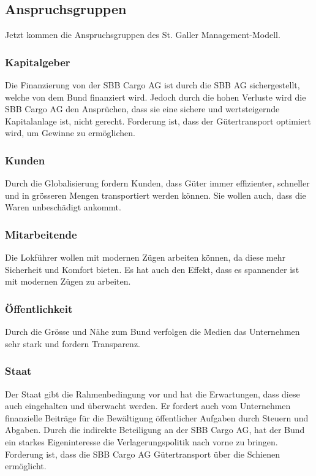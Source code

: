 \documentclass{article}
\begin{document}
\subsection{Anspruchsgruppen}

Jetzt kommen die Anspruchsgruppen des St. Galler Management-Modell.

\subsubsection{Kapitalgeber}
Die Finanzierung von der SBB Cargo AG ist durch die SBB AG sichergestellt, welche von dem Bund finanziert wird.
Jedoch durch die hohen Verluste wird die SBB Cargo AG den Ansprüchen, dass sie eine sichere und wertsteigernde Kapitalanlage ist, nicht gerecht.
Forderung ist, dass der Gütertransport optimiert wird, um Gewinne zu ermöglichen.

\subsubsection{Kunden}
Durch die Globalisierung fordern Kunden, dass Güter immer effizienter, schneller und in grösseren Mengen transportiert werden können.
Sie wollen auch, dass die Waren unbeschädigt ankommt.

\subsubsection{Mitarbeitende}
Die Lokführer wollen mit modernen Zügen arbeiten können, da diese mehr Sicherheit und Komfort bieten.
Es hat auch den Effekt, dass es spannender ist mit modernen Zügen zu arbeiten. 

\subsubsection{Öffentlichkeit}
Durch die Grösse und Nähe zum Bund verfolgen die Medien das Unternehmen sehr stark und fordern Transparenz.

\subsubsection{Staat}
Der Staat gibt die Rahmenbedingung vor und hat die Erwartungen, dass diese auch eingehalten und überwacht werden.
Er fordert auch vom Unternehmen finanzielle Beiträge für die Bewältigung öffentlicher Aufgaben durch Steuern und Abgaben.
Durch die indirekte Beteiligung an der SBB Cargo AG, hat der Bund ein starkes Eigeninteresse die Verlagerungspolitik nach vorne zu bringen.
Forderung ist, dass die SBB Cargo AG Gütertransport über die Schienen ermöglicht.
\end{document}
